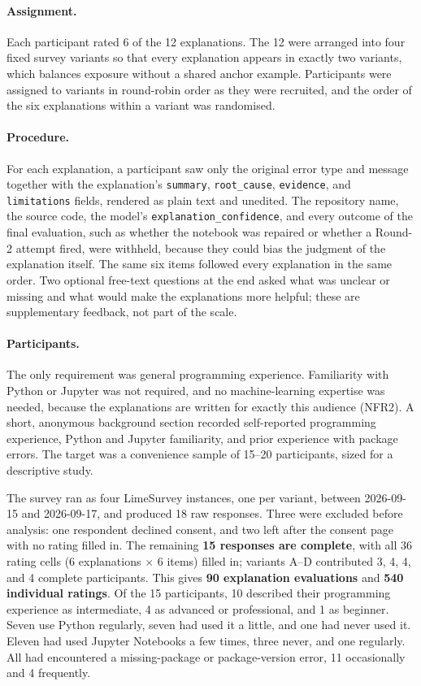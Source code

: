 \paragraph{Assignment.} Each participant rated 6 of the 12 explanations.
The 12 were arranged into four fixed survey variants so that every
explanation appears in exactly two variants, which balances exposure
without a shared anchor example. Participants were assigned to variants
in round-robin order as they were recruited, and the order of the six
explanations within a variant was randomised.

\paragraph{Procedure.} For each explanation, a participant saw only the
original error type and message together with the explanation's
\texttt{summary}, \texttt{root\_cause}, \texttt{evidence}, and
\texttt{limitations} fields, rendered as plain text and unedited. The
repository name, the source code, the model's
\texttt{explanation\_confidence}, and every outcome of the final
evaluation, such as whether the notebook was repaired or whether a
Round-2 attempt fired, were withheld, because they could bias the
judgment of the explanation itself. The same six items followed every
explanation in the same order. Two optional free-text questions at the
end asked what was unclear or missing and what would make the
explanations more helpful; these are supplementary feedback, not part of
the scale.

\paragraph{Participants.} The only requirement was general programming
experience. Familiarity with Python or Jupyter was not required, and no
machine-learning expertise was needed, because the explanations are
written for exactly this audience (NFR2). A short, anonymous background
section recorded self-reported programming experience, Python and
Jupyter familiarity, and prior experience with package errors. The
target was a convenience sample of 15--20 participants, sized for a
descriptive study.

The survey ran as four LimeSurvey instances, one per variant, between
2026-09-15 and 2026-09-17, and produced 18 raw responses. Three were
excluded before analysis: one respondent declined consent, and two left
after the consent page with no rating filled in. The remaining
\textbf{15 responses are complete}, with all 36 rating cells (6
explanations $\times$ 6 items) filled in; variants A--D contributed 3,
4, 4, and 4 complete participants. This gives \textbf{90 explanation
evaluations} and \textbf{540 individual ratings}. Of the 15 participants,
10 described their programming experience as intermediate, 4 as advanced
or professional, and 1 as beginner. Seven use Python regularly, seven
had used it a little, and one had never used it. Eleven had used Jupyter
Notebooks a few times, three never, and one regularly. All had
encountered a missing-package or package-version error, 11 occasionally
and 4 frequently.

